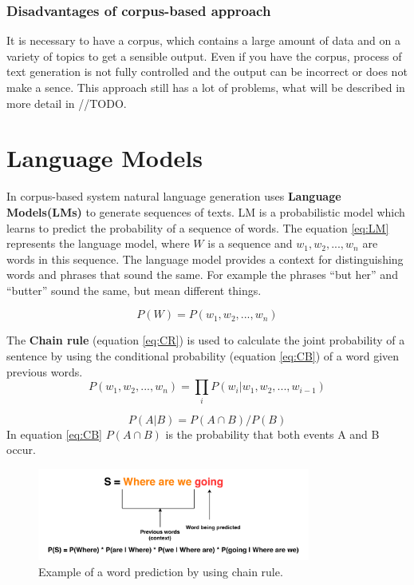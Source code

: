 \subsubsection{Disadvantages of corpus-based approach}
It is necessary to have a corpus, which contains a large amount of data and on a variety of topics to get a sensible output. Even if you have the corpus, process of text generation is not fully controlled and the output can be incorrect or does not make a sence. This approach still has a lot of problems, what will be described in more detail in //TODO. 

\section{Language Models}
In corpus-based system natural language generation uses \textbf{Language Models(LMs)} to generate sequences of texts. LM is a probabilistic model which learns to predict the probability of a sequence of words. The equation \ref{eq:LM} represents the language model, where $W$ is a sequence and $w_1, w_2, ..., w_n$ are words in this sequence. The language model provides a context for distinguishing words and phrases that sound the same. For example the phrases ``but her'' and  ``butter'' sound the same, but mean different things.

\begin{equation} \label{eq:LM}
P(W) = P(w_1, w_2, ..., w_n)
\end{equation}

The \textbf{Chain rule} (equation \ref{eq:CR}) is used to calculate the joint probability of a sentence by using the conditional probability (equation \ref{eq:CB}) of a word given previous words. 
\begin{equation} \label{eq:CR}
P(w_1, w_2,..., w_n) = \prod_{i}P(w_i|w_1, w_2,...,w_{i-1})
\end{equation}

\begin{equation} \label{eq:CB}
P(A|B) = P(A \cap B) / P(B)
\end{equation}
In equation \ref{eq:CB} $P(A \cap B)$ is the probability that both events A and B occur.

\begin{figure}[hbt]
  \centering
  \includegraphics[width=0.8\textwidth]{figures/lm.pdf}
  \caption{Example of a word prediction by using chain rule.}
  \label{chain_rule}
\end{figure}


